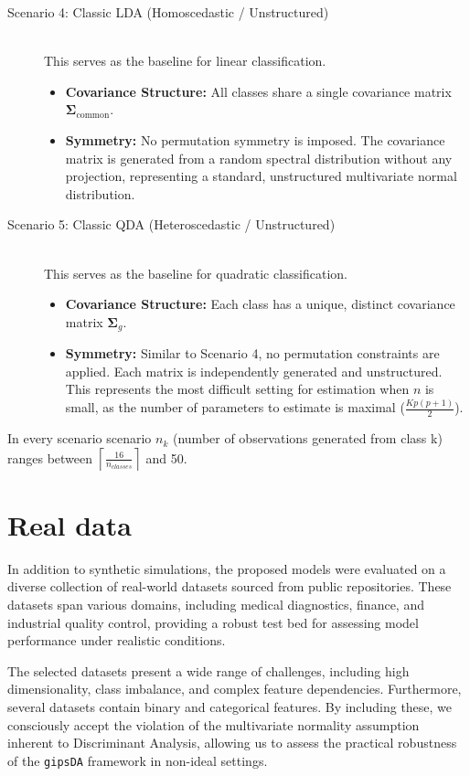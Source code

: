 \documentclass[a4paper,11pt,twoside]{report}
\theoremstyle{definition}
\begin{document}
\begin{description}
    \item[Scenario 4: Classic LDA (Homoscedastic / Unstructured)] \hfill \\
    This serves as the baseline for linear classification.
    \begin{itemize}
        \item \textbf{Covariance Structure:} All classes share a single covariance matrix $\boldsymbol{\Sigma}_{\text{common}}$.
        \item \textbf{Symmetry:} No permutation symmetry is imposed. The covariance matrix is generated from a random spectral distribution without any projection, representing a standard, unstructured multivariate normal distribution.
    \end{itemize}

    \item[Scenario 5: Classic QDA (Heteroscedastic / Unstructured)] \hfill \\
    This serves as the baseline for quadratic classification.
    \begin{itemize}
        \item \textbf{Covariance Structure:} Each class has a unique, distinct covariance matrix $\boldsymbol{\Sigma}_g$.
        \item \textbf{Symmetry:} Similar to Scenario 4, no permutation constraints are applied. Each matrix is independently generated and unstructured. This represents the most difficult setting for estimation when $n$ is small, as the number of parameters to estimate is maximal ($\frac{Kp(p+1)}{2}$).
    \end{itemize}
\end{description}
In every scenario scenario $n_k$ (number of observations generated from class k) ranges between $\left\lceil\frac{16}{n_{classes}}\right\rceil$ and 50.


\section{Real data}
\label{sec:real_world_data}

In addition to synthetic simulations, the proposed models were evaluated on a diverse collection of real-world datasets sourced from public repositories. These datasets span various domains, including medical diagnostics, finance, and industrial quality control, providing a robust test bed for assessing model performance under realistic conditions.

The selected datasets present a wide range of challenges, including high dimensionality, class imbalance, and complex feature dependencies. Furthermore, several datasets contain binary and categorical features. By including these, we consciously accept the violation of the multivariate normality assumption inherent to Discriminant Analysis, allowing us to assess the practical robustness of the \texttt{gipsDA} framework in non-ideal settings.
\end{document}
